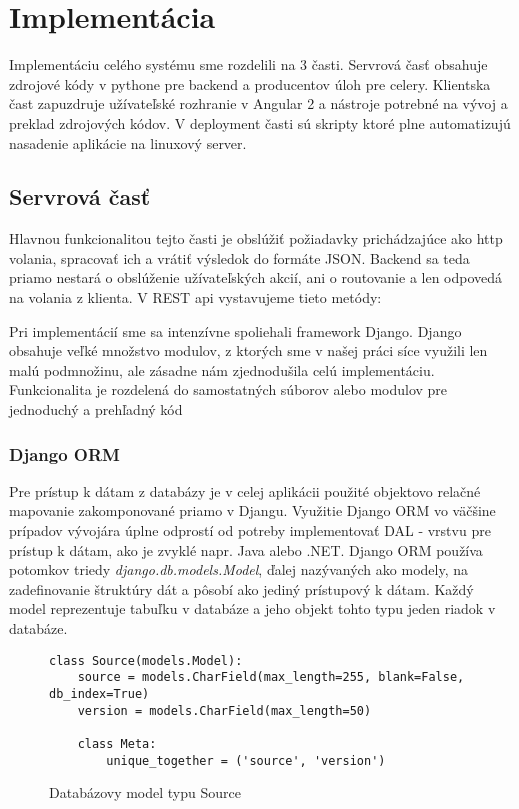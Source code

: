 \chapter{Implementácia}
Implementáciu celého systému sme rozdelili na 3 časti. Servrová časť obsahuje zdrojové kódy v pythone pre backend a producentov úloh pre celery. Klientska čast zapuzdruje užívateľské rozhranie v Angular 2 a nástroje potrebné na vývoj a preklad zdrojových kódov. V deployment časti sú skripty ktoré plne automatizujú nasadenie aplikácie na linuxový server.


\section{Servrová časť}
Hlavnou funkcionalitou tejto časti je obslúžiť požiadavky prichádzajúce ako http volania, spracovať ich a vrátiť výsledok do formáte JSON. Backend sa teda priamo nestará o obslúženie užívateľských akcií, ani o routovanie a len odpovedá na volania z klienta. V REST api vystavujeme tieto metódy:

 \begin{minipage}{0.9\linewidth}
 	\centering
 \end{minipage}
 
 
Pri implementácií sme sa intenzívne spoliehali framework Django. Django obsahuje veľké množstvo modulov, z ktorých sme v našej práci síce využili len malú podmnožinu, ale zásadne nám zjednodušila celú implementáciu. Funkcionalita je rozdelená do samostatných súborov alebo modulov pre jednoduchý a prehľadný kód

\subsection*{Django ORM}
Pre prístup k dátam z databázy je v celej aplikácii použité objektovo relačné mapovanie zakomponované priamo v Djangu. Využitie Django ORM vo väčšine prípadov vývojára úplne odprostí od potreby implementovať DAL - vrstvu pre prístup k dátam, ako je zvyklé napr. Java alebo .NET. Django ORM používa potomkov triedy \emph{django.db.models.Model}, ďalej nazývaných ako modely, na zadefinovanie štruktúry dát a pôsobí ako jediný prístupový k dátam. Každý model reprezentuje tabuľku v databáze a jeho objekt tohto typu jeden riadok v databáze. 

\begin{figure}[htbp]
\centering
\begin{minipage}{0.9\textwidth}
\lstset{tabsize=4,columns=flexible,breaklines=true,breakatwhitespace=true, showstringspaces=false}
\begin{lstlisting}
class Source(models.Model):
    source = models.CharField(max_length=255, blank=False, db_index=True)
    version = models.CharField(max_length=50)

    class Meta:
        unique_together = ('source', 'version')
\end{lstlisting} 		
\end{minipage} 
\caption{Databázovy model typu Source}
\label{fig:static-analysis}
\end{figure}

